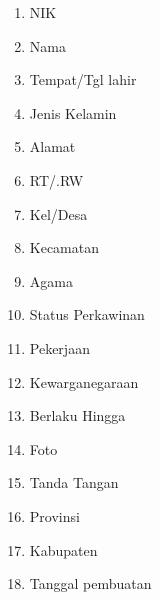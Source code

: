 \documentclass[12pt,a4paper,bahasa]{article}
\begin{document}
\begin{enumerate}

\item NIK
\item Nama
\item Tempat/Tgl lahir
\item Jenis Kelamin
\item Alamat
\item RT/.RW
\item Kel/Desa
\item Kecamatan
\item Agama
\item Status Perkawinan
\item Pekerjaan
\item Kewarganegaraan
\item Berlaku Hingga
\item Foto
\item Tanda Tangan
\item Provinsi
\item Kabupaten
\item Tanggal pembuatan
\end{enumerate}
\end{document}
